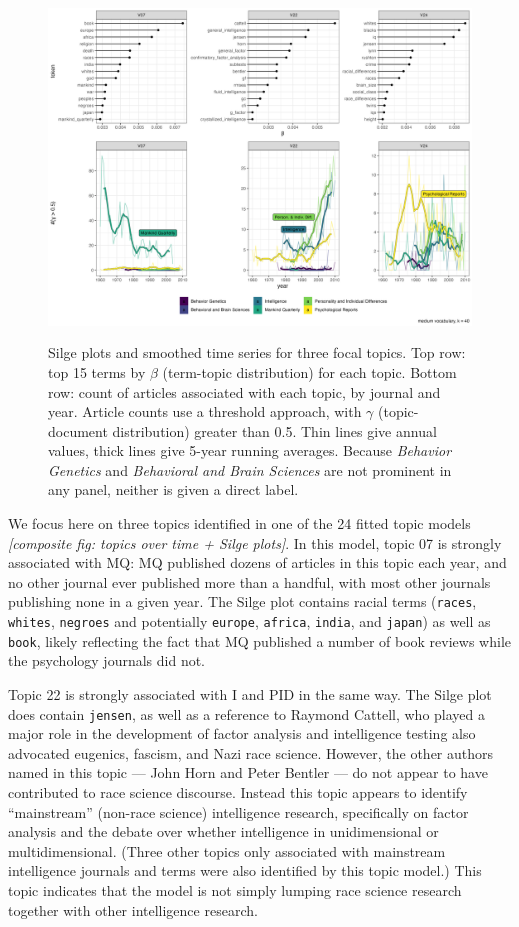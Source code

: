 \documentclass[12pt]{article}
\begin{document}
\begin{figure}
\centering
\includegraphics[width=4.76in,height=3.57in]{img/focal_topics.png}
\caption{Silge plots and smoothed time series for three focal topics.
Top row: top 15 terms by \(\beta\) (term-topic distribution) for each
topic. Bottom row: count of articles associated with each topic, by
journal and year. Article counts use a threshold approach, with
\(\gamma\) (topic-document distribution) greater than 0.5. Thin lines
give annual values, thick lines give 5-year running averages. Because
\emph{Behavior Genetics} and \emph{Behavioral and Brain Sciences} are
not prominent in any panel, neither is given a direct label.}
\end{figure}

We focus here on three topics identified in one of the 24 fitted topic
models \emph{{[}composite fig: topics over time + Silge plots{]}}. In
this model, topic 07 is strongly associated with MQ: MQ published dozens
of articles in this topic each year, and no other journal ever published
more than a handful, with most other journals publishing none in a given
year. The Silge plot contains racial terms (\texttt{races},
\texttt{whites}, \texttt{negroes} and potentially \texttt{europe},
\texttt{africa}, \texttt{india}, and \texttt{japan}) as well as
\texttt{book}, likely reflecting the fact that MQ published a number of
book reviews while the psychology journals did not.

Topic 22 is strongly associated with I and PID in the same way. The
Silge plot does contain \texttt{jensen}, as well as a reference to
Raymond Cattell, who played a major role in the development of factor
analysis and intelligence testing also advocated eugenics, fascism, and
Nazi race science\cite{MehlerBeyondismRaymondCattell1997}. However, the
other authors named in this topic --- John Horn and Peter Bentler --- do
not appear to have contributed to race science discourse. Instead this
topic appears to identify ``mainstream'' (non-race science) intelligence
research, specifically on factor analysis and the debate over whether
intelligence in unidimensional or multidimensional. (Three other topics
only associated with mainstream intelligence journals and terms were
also identified by this topic model.) This topic indicates that the
model is not simply lumping race science research together with other
intelligence research.
\end{document}
